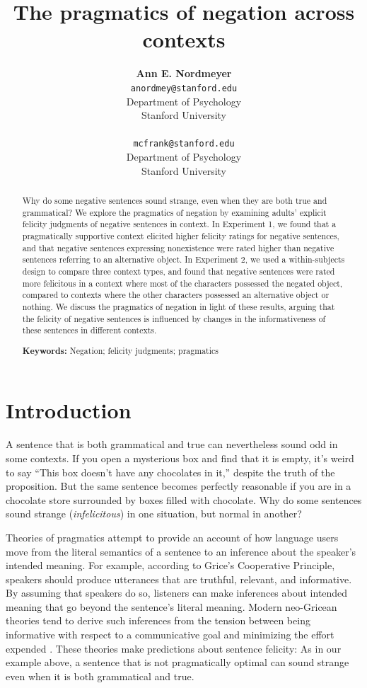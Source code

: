 \documentclass[10pt,letterpaper]{article}
\title{The pragmatics of negation across contexts}
\author{{\large \bf Ann E. Nordmeyer} \\ \texttt{anordmey@stanford.edu}\\ Department of Psychology \\ Stanford University \\ 
\And {\large \bf Michael C. Frank} \\ \texttt{mcfrank@stanford.edu} \\ Department of Psychology \\ Stanford University \\ }
\begin{document}
\maketitle


\begin{abstract}
Why do some negative sentences sound strange, even when they are both true and grammatical? We explore the pragmatics of negation by examining adults' explicit felicity judgments of negative sentences in context.  In Experiment 1, we found that a pragmatically supportive context elicited higher felicity ratings for negative sentences, and that negative sentences expressing nonexistence were rated higher than negative sentences referring to an alternative object.  In Experiment 2, we used a within-subjects design to compare three context types, and found that negative sentences were rated more felicitous in a context where most of the characters possessed the negated object, compared to contexts where the other characters possessed an alternative object or nothing.  We discuss the pragmatics of negation in light of these results, arguing that the felicity of negative sentences is influenced by changes in the informativeness of these sentences in different contexts. 

\textbf{Keywords:} 
Negation; felicity judgments; pragmatics
\end{abstract}

\section{Introduction}

A sentence that is both grammatical and true can nevertheless sound odd in some contexts. If you open a mysterious box and find that it is empty, it's weird to say ``This box doesn't have any chocolates in it,'' despite the truth of the proposition. But the same sentence becomes perfectly reasonable if you are in a chocolate store surrounded by boxes filled with chocolate.  Why do some sentences sound strange (\emph{infelicitous}) in one situation, but normal in another?

Theories of pragmatics attempt to provide an account of how language users move from the literal semantics of a sentence to an inference about the speaker's intended meaning. For example, according to Grice's \citeyear{grice1975} Cooperative Principle, speakers should produce utterances that are truthful, relevant, and informative.  By assuming that speakers do so, listeners can make inferences about intended meaning that go beyond the sentence's literal meaning. Modern neo-Gricean theories tend to derive such inferences from the tension between being informative with respect to a communicative goal and minimizing the effort expended \cite{horn1984,levinson2000,frank2012}. These theories make predictions about sentence felicity: As in our example above, a sentence that is not pragmatically optimal can sound strange even when it is both grammatical and true.
\end{document}
